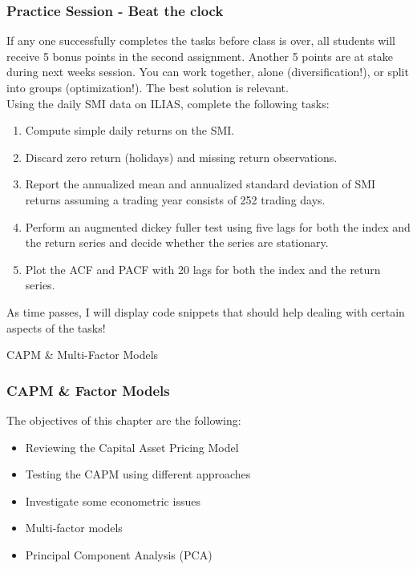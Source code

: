 \documentclass[xcolor=dvipsnames, english, 8pt]{beamer}
\begin{document}
\begin{frame}
    \frametitle{Practice Session - Beat the clock}
    If any one successfully completes the tasks before class is over, all students will receive 5 bonus points in the second assignment. Another 5 points are at stake during next weeks session. You can work together, alone (diversification!), or split into groups (optimization!). The best solution is relevant.\vspace{1cm}\\
    
Using the daily SMI data on ILIAS, complete the following tasks:
\begin{enumerate}[1)]
	\item Compute simple daily returns on the SMI.
	\item Discard zero return (holidays) and missing return observations.
	\item 	Report the annualized mean and annualized standard deviation of SMI returns assuming a trading year consists of 252 trading days.
	\item Perform an augmented dickey fuller test using five lags for both the index and the return series and decide whether the series are stationary.

	\item Plot the ACF and PACF with 20 lags for both the index and the return series.
\end{enumerate}

\vfill

As time passes, I will display code snippets that should help dealing with certain aspects of the tasks!

\end{frame}

\begin{frame}[label=CAPM]
    \begin{center}
        {\color{ubRed} \Huge{CAPM \& Multi-Factor Models}}
    \end{center}
\end{frame}

\begin{frame}
    \frametitle{CAPM \& Factor Models}
    The objectives of this chapter are the following:\vspace{0.25cm}\\
    \begin{itemize}
        \item Reviewing the Capital Asset Pricing Model
        \item Testing the CAPM using different approaches
        \item Investigate some econometric issues
        \item Multi-factor models
        \item Principal Component Analysis (PCA)
    \end{itemize}
\end{frame}
\end{document}
